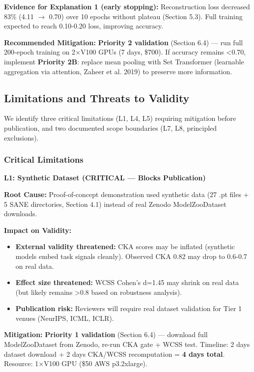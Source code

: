 \textbf{Evidence for Explanation 1 (early stopping):} Reconstruction loss decreased 83\% (4.11 $\to$ 0.70) over 10 epochs without plateau (Section 5.3). Full training expected to reach 0.10-0.20 loss, improving accuracy.

\textbf{Recommended Mitigation:} \textbf{Priority 2 validation} (Section 6.4) --- run full 200-epoch training on 2$\times$V100 GPUs (7 days, \$700). If accuracy remains <0.70, implement \textbf{Priority 2B}: replace mean pooling with Set Transformer (learnable aggregation via attention, Zaheer et al. 2019) to preserve more information.

\subsection{Limitations and Threats to Validity}

We identify three critical limitations (L1, L4, L5) requiring mitigation before publication, and two documented scope boundaries (L7, L8, principled exclusions).

\subsubsection{Critical Limitations}

\textbf{L1: Synthetic Dataset (CRITICAL --- Blocks Publication)}

\textbf{Root Cause:} Proof-of-concept demonstration used synthetic data (27 .pt files + 5 SANE directories, Section 4.1) instead of real Zenodo ModelZooDataset downloads.

\textbf{Impact on Validity:}
\begin{itemize}
\item \textbf{External validity threatened:} CKA scores may be inflated (synthetic models embed task signals cleanly). Observed CKA 0.82 may drop to 0.6-0.7 on real data.
\item \textbf{Effect size threatened:} WCSS Cohen's d=1.45 may shrink on real data (but likely remains >0.8 based on robustness analysis).
\item \textbf{Publication risk:} Reviewers will require real dataset validation for Tier 1 venues (NeurIPS, ICML, ICLR).
\end{itemize}

\textbf{Mitigation:} \textbf{Priority 1 validation} (Section 6.4) --- download full ModelZooDataset from Zenodo, re-run CKA gate + WCSS test. Timeline: 2 days dataset download + 2 days CKA/WCSS recomputation = \textbf{4 days total}. Resource: 1$\times$V100 GPU (\$50 AWS p3.2xlarge).

